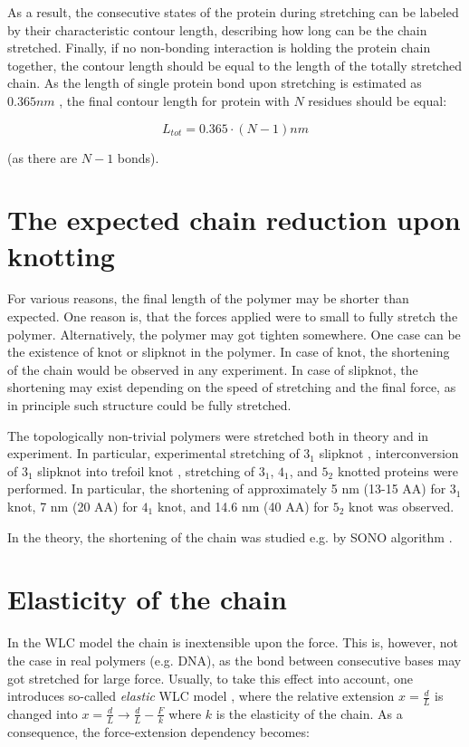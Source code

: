 As a result, the consecutive states of the protein during stretching can be labeled by their characteristic contour length, describing how long can be the chain stretched.
Finally, if no non-bonding interaction is holding the protein chain together, the contour length should be equal to the length of the totally stretched chain.
As the length of single protein bond upon stretching is estimated as $0.365 nm$ \cite{}, the final contour length for protein with $N$ residues should be equal:

\begin{equation}
    \boxed{L_{tot} = 0.365\cdot(N-1) nm}
\end{equation}

(as there are $N-1$ bonds).

\section{The expected chain reduction upon knotting}
\label{sec:theory_knotting}
For various reasons, the final length of the polymer may be shorter than expected.
One reason is, that the forces applied were to small to fully stretch the polymer.
Alternatively, the polymer may got tighten somewhere.
One case can be the existence of knot or slipknot in the polymer.
In case of knot, the shortening of the chain would be observed in any experiment.
In case of slipknot, the shortening may exist depending on the speed of stretching and the final force, as in principle such structure could be fully stretched.

The topologically non-trivial polymers were stretched both in theory and in experiment.
In particular, experimental stretching of $3_1$ slipknot \cite{he2012mechanically,wang2019mechanical,he2019direct}, interconversion of $3_1$ slipknot into trefoil knot \cite{he2014mechanically}, stretching of $3_1$, $4_1$, and $5_2$ knotted proteins \cite{ziegler2016knotting, dzubiella2009sequence} were performed.
In particular, the shortening of approximately 5 nm (13-15 AA) for $3_1$ knot, 7 nm (20 AA) for $4_1$ knot, and 14.6 nm (40 AA) for $5_2$ knot was observed.

In the theory, the shortening of the chain was studied e.g. by SONO algorithm \cite{pieranski2001tight}.

\section{Elasticity of the chain}
\label{sec:theory_ewlc}
In the WLC model the chain is inextensible upon the force. This is, however, not the case in real polymers (e.g. DNA), as the bond between consecutive bases may got stretched for large force.
Usually, to take this effect into account, one introduces so-called \textit{elastic} WLC model \cite{}, where the relative extension $x=\frac{d}{L}$ is changed into $x=\frac{d}{L}\rightarrow \frac{d}{L}-\frac{F}{k}$ where $k$ is the elasticity of the chain.
As a consequence, the force-extension dependency becomes:

